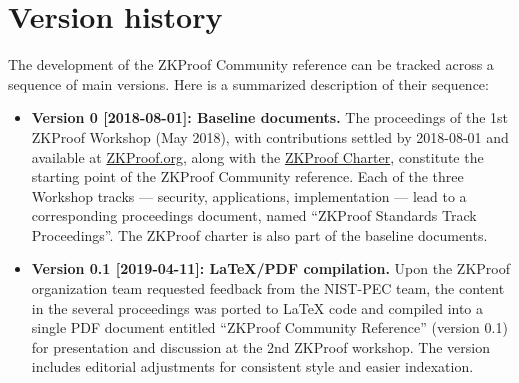 \chapter{Version history}
\label{app:version-history}



The development of the ZKProof Community reference can be tracked across a sequence of main versions.
Here is a summarized description of their sequence:

\begin{itemize}\setlength{\itemsep}{1em}

\item \textbf{Version 0 [2018-08-01]: Baseline documents.}
	The proceedings of the 1st ZKProof Workshop (May 2018), 
with contributions settled by 2018-08-01 and available 
at \href{https://zkproof.org/documents}{ZKProof.org},
along with the \hyperref[sec:prelim:charter]{ZKProof Charter}, 
constitute the starting point of the ZKProof Community reference.
	Each of the three Workshop tracks --- security, applications, implementation --- 
lead to a corresponding proceedings document, 
named ``ZKProof Standards  Track Proceedings''.
	The ZKProof charter is also part of the baseline documents.


\item \textbf{Version 0.1 [2019-04-11]: LaTeX/PDF compilation.}
	Upon the ZKProof organization team requested feedback from the NIST-PEC team, the content in the 
several proceedings was ported to LaTeX code and compiled into a single PDF document entitled 
``ZKProof Community Reference'' (version 0.1) for presentation and discussion at the 2nd ZKProof workshop.
	The version includes editorial adjustments for consistent style and easier indexation. 



\end{itemize}
